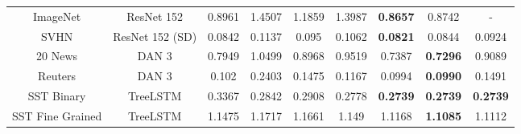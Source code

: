 {\begin{tabular}{c c c c c c c c c}
         ImageNet &       ResNet 152 &       0.8961 &        1.4507 &   1.1859 &  1.3987 &      {\bf0.8657} &         0.8742 &              - \\
             SVHN &  ResNet 152 (SD) &       0.0842 &        0.1137 &    0.095 &  0.1062 &      {\bf0.0821} &         0.0844 &         0.0924 \\
              \midrule
          20 News &            DAN 3 &       0.7949 &        1.0499 &   0.8968 &  0.9519 &        0.7387 &       {\bf0.7296} &         0.9089 \\
          Reuters &            DAN 3 &        0.102 &        0.2403 &   0.1475 &  0.1167 &        0.0994 &       {\bf0.0990} &         0.1491 \\
       SST Binary &         TreeLSTM &       0.3367 &        0.2842 &   0.2908 &  0.2778 &        {\bf0.2739} &       {\bf0.2739} &        {\bf0.2739} \\
 SST Fine Grained &         TreeLSTM &       1.1475 &        1.1717 &   1.1661 &   1.149 &        1.1168 &       {\bf1.1085} &         1.1112 \\
\bottomrule
\end{tabular}
}
